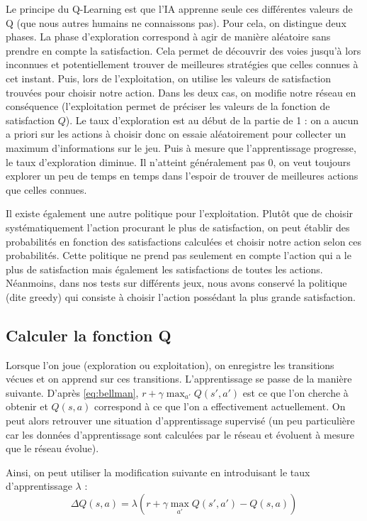 Le principe du Q-Learning est que l'IA apprenne seule ces différentes valeurs de Q (que nous autres humains ne connaissons pas). Pour cela, on distingue deux phases.
La phase d'exploration correspond à agir de manière aléatoire sans prendre en compte la satisfaction. Cela permet de découvrir des voies jusqu'à lors inconnues et 
potentiellement trouver de meilleures stratégies que celles connues à cet instant. Puis, lors de l'exploitation, on utilise les valeurs de satisfaction trouvées
pour choisir notre action. Dans les deux cas, on modifie notre réseau en conséquence (l'exploitation permet de préciser les valeurs de la fonction de satisfaction $Q$).
Le taux d'exploration est au début de la partie de 1 : on a aucun a priori sur les actions à choisir donc on essaie aléatoirement pour collecter un maximum d'informations
sur le jeu. Puis à mesure que l'apprentissage progresse, le taux d'exploration diminue. Il n'atteint généralement pas 0, on veut toujours explorer un peu de temps en temps
dans l'espoir de trouver de meilleures actions que celles connues. 

Il existe également une autre politique pour l'exploitation. Plutôt que de choisir systématiquement l'action procurant le plus de satisfaction, on peut
établir des probabilités en fonction des satisfactions calculées et choisir notre action selon ces probabilités. Cette politique ne prend pas seulement en compte
l'action qui a le plus de satisfaction mais également les satisfactions de toutes les actions. Néanmoins, dans nos tests sur différents jeux, nous avons conservé
la politique (dite greedy) qui consiste à choisir l'action possédant la plus grande satisfaction.

\subsection{Calculer la fonction Q}

Lorsque l'on joue (exploration ou exploitation), on enregistre les transitions vécues et on apprend sur ces transitions. L'apprentissage se passe de la manière
suivante. D'après \ref{eq:bellman}, $r + \gamma \max_{a'} Q\left(s',a'\right)$ est ce que l'on cherche à obtenir et $Q\left(s,a\right)$ correspond à ce que l'on
a effectivement actuellement. On peut alors retrouver une situation d'apprentissage supervisé (un peu particulière car les données d'apprentissage sont calculées par 
le réseau et évoluent à mesure que le réseau évolue).

Ainsi, on peut utiliser la modification suivante en introduisant le taux d'apprentissage $\lambda$ : 
\begin{equation}
 \Delta Q\left(s,a\right) = \lambda\left(r + \gamma \max_{a'} Q\left(s',a'\right) - Q\left(s,a\right)\right)
 \label{eq:modif-bellman}
\end{equation}

